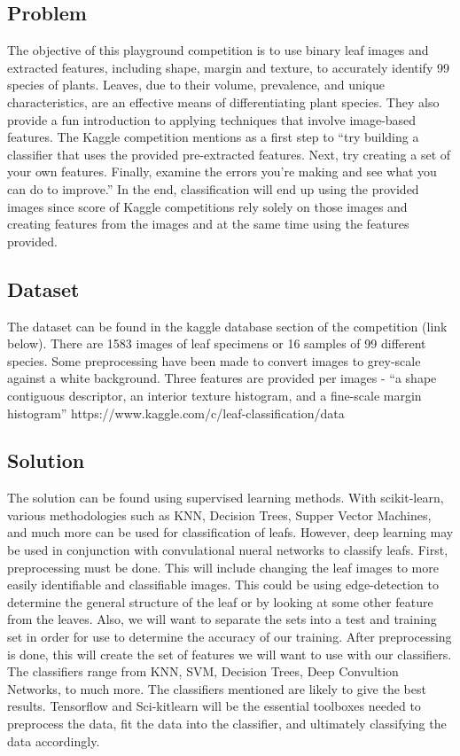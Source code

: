 \documentclass{article}
\begin{document}
\subsection{Problem}
The objective of this playground competition is to use binary leaf images and extracted features, including shape, margin and texture, to accurately identify 99 species of plants. Leaves, due to their volume, prevalence, and unique characteristics, are an effective means of differentiating plant species. They also provide a fun introduction to applying techniques that involve image-based features.
\newline\newline
The Kaggle competition mentions as a first step to ``try building a classifier that uses the provided pre-extracted features. Next, try creating a set of your own features. Finally, examine the errors you're making and see what you can do to improve.''  In the end, classification will end up using the provided images since score of Kaggle competitions rely solely on those images and creating features from the images and at the same time using the features provided.

\subsection{Dataset}
The dataset can be found in the kaggle database section of the competition (link below). There are 1583 images of leaf specimens or 16 samples of 99 different species.  Some preprocessing have been made to convert images to grey-scale against a white background. Three features are provided per images - ``a shape contiguous descriptor, an interior texture histogram, and a ﬁne-scale margin histogram''
 https://www.kaggle.com/c/leaf-classification/data 

\subsection{Solution}
The solution can be found using supervised learning methods. With scikit-learn, various methodologies such as KNN, Decision Trees, Supper Vector Machines, and much more can be used for classification of leafs. However, deep learning may be used in conjunction with convulational nueral networks to classify leafs. First, preprocessing must be done. This will include changing the leaf images to more easily identifiable and classifiable images. This could be using edge-detection to determine the general structure of the leaf or by looking at some other feature from the leaves. Also, we will want to separate the sets into a test and training set in order for use to determine the accuracy of our training. After preprocessing is done, this will create the set of features we will want to use with our classifiers. The classifiers range from KNN, SVM, Decision Trees, Deep Convultion Networks, to much more. The classifiers mentioned are likely to give the best results. Tensorflow and Sci-kitlearn will be the essential toolboxes needed to preprocess the data, fit the data into the classifier, and ultimately classifying the data accordingly.
\end{document}

